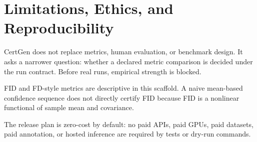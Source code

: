 \section{Limitations, Ethics, and Reproducibility}

CertGen does not replace metrics, human evaluation, or benchmark design. It asks a narrower question: whether a declared metric comparison is decided under the run contract. Before real runs, empirical strength is blocked.

FID and FD-style metrics are descriptive in this scaffold. A naive mean-based confidence sequence does not directly certify FID because FID is a nonlinear functional of sample mean and covariance.

The release plan is zero-cost by default: no paid APIs, paid GPUs, paid datasets, paid annotation, or hosted inference are required by tests or dry-run commands.
